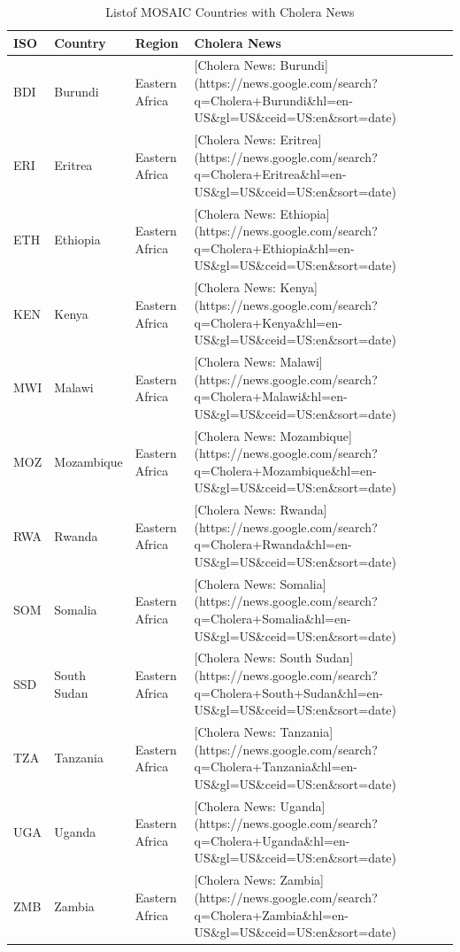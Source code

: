 \documentclass[
]{book}
\begin{document}
\begin{table}

\caption{\label{tab:mosaic-table}Listof MOSAIC Countries with Cholera News}
\centering
\begin{tabular}[t]{l|l|l|l}
\hline
ISO & Country & Region & Cholera News\\
\hline
BDI & Burundi & Eastern Africa & [Cholera News: Burundi](https://news.google.com/search?q=Cholera+Burundi\&hl=en-US\&gl=US\&ceid=US:en\&sort=date)\\
\hline
ERI & Eritrea & Eastern Africa & [Cholera News: Eritrea](https://news.google.com/search?q=Cholera+Eritrea\&hl=en-US\&gl=US\&ceid=US:en\&sort=date)\\
\hline
ETH & Ethiopia & Eastern Africa & [Cholera News: Ethiopia](https://news.google.com/search?q=Cholera+Ethiopia\&hl=en-US\&gl=US\&ceid=US:en\&sort=date)\\
\hline
KEN & Kenya & Eastern Africa & [Cholera News: Kenya](https://news.google.com/search?q=Cholera+Kenya\&hl=en-US\&gl=US\&ceid=US:en\&sort=date)\\
\hline
MWI & Malawi & Eastern Africa & [Cholera News: Malawi](https://news.google.com/search?q=Cholera+Malawi\&hl=en-US\&gl=US\&ceid=US:en\&sort=date)\\
\hline
MOZ & Mozambique & Eastern Africa & [Cholera News: Mozambique](https://news.google.com/search?q=Cholera+Mozambique\&hl=en-US\&gl=US\&ceid=US:en\&sort=date)\\
\hline
RWA & Rwanda & Eastern Africa & [Cholera News: Rwanda](https://news.google.com/search?q=Cholera+Rwanda\&hl=en-US\&gl=US\&ceid=US:en\&sort=date)\\
\hline
SOM & Somalia & Eastern Africa & [Cholera News: Somalia](https://news.google.com/search?q=Cholera+Somalia\&hl=en-US\&gl=US\&ceid=US:en\&sort=date)\\
\hline
SSD & South Sudan & Eastern Africa & [Cholera News: South Sudan](https://news.google.com/search?q=Cholera+South+Sudan\&hl=en-US\&gl=US\&ceid=US:en\&sort=date)\\
\hline
TZA & Tanzania & Eastern Africa & [Cholera News: Tanzania](https://news.google.com/search?q=Cholera+Tanzania\&hl=en-US\&gl=US\&ceid=US:en\&sort=date)\\
\hline
UGA & Uganda & Eastern Africa & [Cholera News: Uganda](https://news.google.com/search?q=Cholera+Uganda\&hl=en-US\&gl=US\&ceid=US:en\&sort=date)\\
\hline
ZMB & Zambia & Eastern Africa & [Cholera News: Zambia](https://news.google.com/search?q=Cholera+Zambia\&hl=en-US\&gl=US\&ceid=US:en\&sort=date)\\

\end{tabular}
\end{table}
\end{document}

